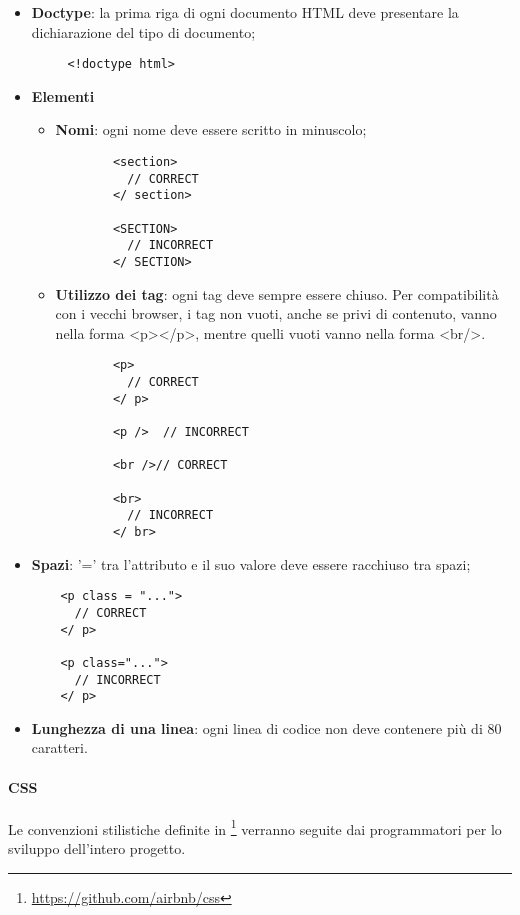 \begin{itemize}
	\item{\textbf{Doctype}: la prima riga di ogni documento HTML deve presentare la dichiarazione del tipo di documento;}
	 \begin{lstlisting}
	 <!doctype html> 
	 \end{lstlisting}
	 \item{\textbf{Elementi}}
	 \begin{itemize}
	 	\item{\textbf{Nomi}: ogni nome deve essere scritto in minuscolo;}
	 	\begin{lstlisting}
	 	<section>
	 	  // CORRECT
	 	</ section> 
	 	
	 	<SECTION>
	 	  // INCORRECT
	 	</ SECTION> 
	 	\end{lstlisting}
	 	\item{\textbf{Utilizzo dei tag}: ogni tag deve sempre essere chiuso. Per compatibilità con i vecchi browser, i tag non vuoti, anche se privi di contenuto, vanno nella forma <p></p>, mentre quelli vuoti vanno nella forma <br/>. 	
	 	}
 		\begin{lstlisting}
 		<p>
 		  // CORRECT
 		</ p>
 		
 		<p />  // INCORRECT
 		
 		<br />// CORRECT
 		
 		<br>
 		  // INCORRECT
 		</ br>   
 		\end{lstlisting} 
	 \end{itemize}
 	\item{\textbf{Spazi}: '=' tra l'attributo e il suo valore deve essere racchiuso tra spazi;}
 	\begin{lstlisting}
 	<p class = "...">
 	  // CORRECT
 	</ p>
 	
 	<p class="...">  
 	  // INCORRECT
 	</ p>
 	\end{lstlisting} 
 	\item{\textbf{Lunghezza di una linea}: ogni linea di codice non deve contenere più di 80 caratteri.
 	}
\end{itemize}

\paragraph{CSS}\Spazio
Le convenzioni stilistiche definite in \footnote{\url{https://github.com/airbnb/css}} verranno seguite dai programmatori per lo sviluppo dell'intero progetto.

